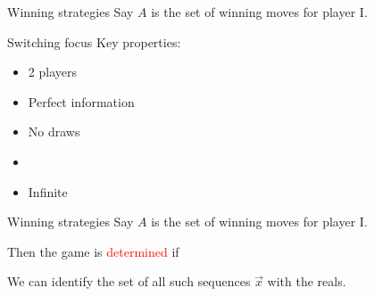 \documentclass{beamer}
\begin{document}
\begin{frame}{Winning strategies}
	Say $A$ is the set of winning moves for player I.\vspace{0.3cm}
 


\end{frame}

\begin{frame}{Switching focus}
	Key properties:
	\begin{itemize}
		\item 2 players
		\item Perfect information
		\item No draws
		\item {}
		\item<3> Infinite
	\end{itemize}
\end{frame}


\begin{frame}{Winning strategies}
	Say $A$ is the set of winning moves for player I.\vspace{0.3cm}
 
	Then the game is \textcolor{red}{determined} if
		\only<1>{\begin{align*}
			\lnot\exists x_0\in\omega\forall x_1\in\omega\cdots(\vec x\in A)\equiv\forall x_0\in\omega\exists x_1\in\omega\cdots(\vec x\notin A)
		\end{align*}}
		\only<2->{\begin{align*}
			\lnot\Game^{\exists}\vec x(\vec x\in A)\equiv\Game^{\forall}\vec x(\vec x\notin A)
		\end{align*}}

	 We can identify the set of all such sequences $\vec x$ with the reals.
\end{frame}
\end{document}
